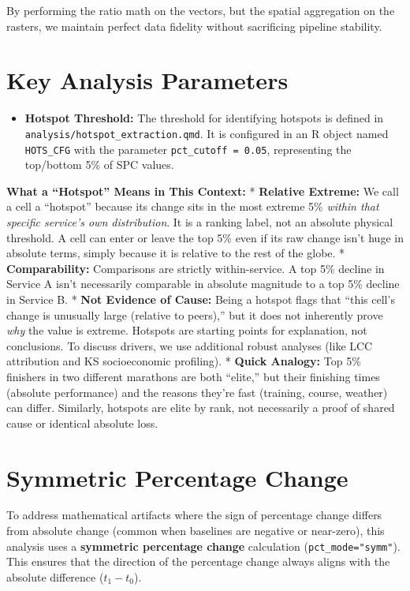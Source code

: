 \documentclass[
  letterpaper,
  DIV=11,
  numbers=noendperiod]{scrreprt}
\providecommand{\tightlist}{%
  \setlength{\itemsep}{0pt}\setlength{\parskip}{0pt}}
\begin{document}
By performing the ratio math on the vectors, but the spatial aggregation
on the rasters, we maintain perfect data fidelity without sacrificing
pipeline stability.

\section{Key Analysis Parameters}\label{key-analysis-parameters}

\begin{itemize}
\tightlist
\item
  \textbf{Hotspot Threshold:} The threshold for identifying hotspots is
  defined in \texttt{analysis/hotspot\_extraction.qmd}. It is configured
  in an R object named \texttt{HOTS\_CFG} with the parameter
  \texttt{pct\_cutoff\ =\ 0.05}, representing the top/bottom 5\% of SPC
  values.
\end{itemize}

\textbf{What a ``Hotspot'' Means in This Context:} * \textbf{Relative
Extreme:} We call a cell a ``hotspot'' because its change sits in the
most extreme 5\% \emph{within that specific service's own distribution}.
It is a ranking label, not an absolute physical threshold. A cell can
enter or leave the top 5\% even if its raw change isn't huge in absolute
terms, simply because it is relative to the rest of the globe. *
\textbf{Comparability:} Comparisons are strictly within-service. A top
5\% decline in Service A isn't necessarily comparable in absolute
magnitude to a top 5\% decline in Service B. * \textbf{Not Evidence of
Cause:} Being a hotspot flags that ``this cell's change is unusually
large (relative to peers),'' but it does not inherently prove \emph{why}
the value is extreme. Hotspots are starting points for explanation, not
conclusions. To discuss drivers, we use additional robust analyses (like
LCC attribution and KS socioeconomic profiling). * \textbf{Quick
Analogy:} Top 5\% finishers in two different marathons are both
``elite,'' but their finishing times (absolute performance) and the
reasons they're fast (training, course, weather) can differ. Similarly,
hotspots are elite by rank, not necessarily a proof of shared cause or
identical absolute loss.

\section{Symmetric Percentage Change}\label{symmetric-percentage-change}

To address mathematical artifacts where the sign of percentage change
differs from absolute change (common when baselines are negative or
near-zero), this analysis uses a \textbf{symmetric percentage change}
calculation (\texttt{pct\_mode="symm"}). This ensures that the direction
of the percentage change always aligns with the absolute difference
(\(t_1 - t_0\)).
\end{document}
